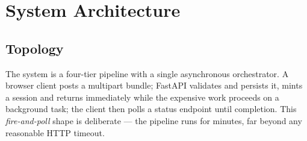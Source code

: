 \documentclass[11pt,a4paper]{article}
\begin{document}
\section{System Architecture}

\subsection{Topology}

The system is a four-tier pipeline with a single asynchronous orchestrator. A browser
client posts a multipart bundle; FastAPI validates and persists it, mints a session and
returns immediately while the expensive work proceeds on a background task; the client
then polls a status endpoint until completion. This \emph{fire-and-poll} shape is
deliberate --- the pipeline runs for minutes, far beyond any reasonable HTTP timeout.
\end{document}
